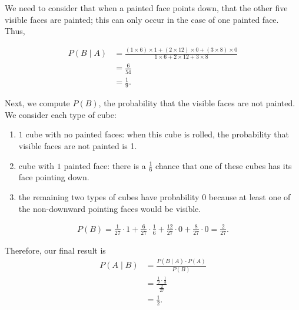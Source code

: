 \documentclass{article}
\theoremstyle{mytheoremstyle}
\theoremstyle{mytheoremstyle}
\theoremstyle{myproblemstyle}
\begin{document}
    We need to consider that when a painted face points down, that the other
    five visible faces are painted; this can only occur in the case of one painted
    face. Thus,

    \begin{align*}
      P(B \mid A) &= \frac{(1\times 6) \times 1 + (2 \times 12) \times 0 + (3
      \times 8) \times  0}{1\times 6 + 2\times 12 + 3\times 8} \\
        &= \frac{6}{54} \\
        &= \frac{1}{9}.
    \end{align*}

    Next, we compute \( P (B) \), the probability that the visible faces are
    not painted. We consider each type of cube:

    \begin{enumerate}
      \item \( 1 \) cube with no painted faces: when this cube is rolled, the
        probability that visible faces are not painted is 1.
      \item cube with \( 1 \) painted face: there is a \( \frac{1}{6} \) chance
        that one of these cubes has its face pointing down.
      \item the remaining two types of cubes have probability \( 0 \) because
        at least one of the non-downward pointing faces would be visible.
    \end{enumerate}

    \begin{align*}
      P(B) = \frac{1}{27} \cdot 1 + \frac{6}{27} \cdot \frac{1}{6} +
      \frac{12}{27}\cdot 0 + \frac{8}{27} \cdot 0 = \frac{2}{27}.
    \end{align*}

    Therefore, our final result is
    \begin{align*}
      P(A \mid B) &= \frac{P(B \mid A) \cdot P(A)}{P(B)} \\
                  &= \frac{\frac{1}{9} \cdot \frac{1}{3}}{\frac{2}{27}}  \\
                  &= \frac{1}{2}.
    \end{align*}
\end{document}
